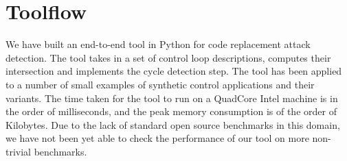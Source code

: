 \section{Toolflow} \label{sec5}
\noindent
We have built an end-to-end tool in Python for code replacement attack detection.
The tool takes in a set of control loop descriptions, computes their intersection and 
implements the cycle detection step. The tool has been applied to a number of small 
examples of synthetic control applications and their variants. The time taken for
the tool to run on a QuadCore Intel machine is in the order of milliseconds, and the
peak memory consumption is of the order of Kilobytes. Due to the lack of standard open
source benchmarks in this domain, we have not been yet able to check the performance of
our tool on more non-trivial benchmarks. 
